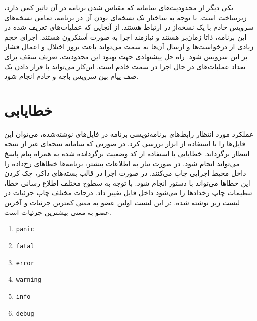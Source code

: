 یکی دیگر از محدودیت‌های سامانه که مقیاس شدن برنامه در آن تاثیر کمی دارد، زیرساخت  است. با توجه به ساختار تک نسخه‌ای بودن آن در برنامه، تمامی نسخه‌های سرویس خادم با یک نسخه‌از  در ارتباط هستند. از آنجایی که عملیات‌های تعریف شده در این برنامه، ذاتا زمان‌بر هستند و نیازمند اجرا به صورت آسنکرون هستند. اجرای حجم زیادی از درخواست‌ها و ارسال آن‌ها به سمت  می‌تواند باعث بروز اختلال و اعمال فشار بر این سرویس شود. راه حل پیشنهادی جهت بهبود این محدودیت، تعریف سقف برای تعداد عملیات‌های در حال اجرا در سمت خادم است. این‌کار می‌تواند با قرار دادن یک صف پیام بین سرویس باجه و خادم انجام شود.

\clearpage
\section{خطایابی}
عملکرد مورد انتظار رابط‌های برنامه‌نویسی برنامه در فایل‌های  نوشته‌شده، می‌توان این فایل‌ها را با استفاده از ابزار  بررسی کرد. در صورتی که سامانه نتیجه‌ای غیر از نتیجه انتظار برگرداند. خطایابی با استفاده از کد وضعیت برگردانده شده به همراه پیام پاسخ می‌تواند انجام شود. در صورت نیاز به اطلاعات بیشتر، برنامه‌ها خطا‌های رخ‌داده را داخل  محیط اجرایی چاپ می‌کنند. در صورت اجرا در قالب بسته‌های داکر، چک کردن این خطا‌ها می‌تواند با دستور  انجام شود. با توجه به سطوح مختلف اطلاع رسانی خطا، تنظیمات چاپ رخداد‌ها را می‌شود داخل فایل  تغییر داد. درجات مختلف چاپ جزئیات در لیست زیر نوشته شده. در این لیست اولین عضو به معنی کمترین جزئیات و آخرین عضو به معنی بیشترین جزئیات است.

\begin{enumerate}
	\item \texttt{panic}
	\item \texttt{fatal}
	\item \texttt{error}
	\item \texttt{warning}
	\item \texttt{info}
	\item \texttt{debug}
\end{enumerate}
